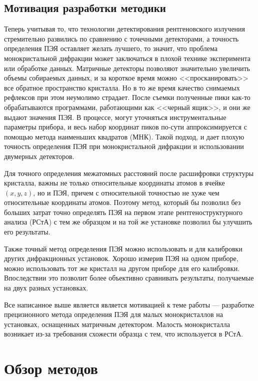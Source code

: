 \documentclass[a4paper,14pt]{extarticle}
\newcounter{x}
\begin{document}
\subsection{Мотивация разработки методики}

Теперь учитывая то, что технологии детектирования рентгеновского излучения стремительно развились по сравнению с точечными детекторами, а точность определения ПЭЯ оставляет желать лучшего, то значит, что проблема монокристальной дифракции может заключаться в плохой технике эксперимента или обработке данных.
Матричные детекторы позволяют значительно увеличить объемы собираемых данных, и за короткое время можно <<просканировать>> все обратное пространство кристалла.
Но в то же время качество снимаемых рефлексов при этом неумолимо страдает.
После съемки полученные пики как-то обрабатываются программами, работающими как <<черный ящик>>, и они же выдают значения ПЭЯ.
В процессе, могут уточняться инструментальные параметры прибора, и весь набор координат пиков по-сути аппроксимируется с помощью метода наименьших квадратов (МНК).
Такой подход, и дает плохую точность определения ПЭЯ при монокристальной дифракции и использовании двумерных детекторов.

Для точного определения межатомных расстояний после расшифровки структуры кристалла, важны не только относительные координаты атомов в ячейке $(x, y, z)$, но и ПЭЯ, причем с относительной точностью не хуже чем относительные координаты атомов.
Поэтому метод, который бы позволил без больших затрат точно определять ПЭЯ на первом этапе рентгеноструктурного анализа (РСтА) с тем же образцом и на той же установке позволил бы улучшить его результаты.

Также точный метод определения ПЭЯ можно использовать и для калибровки других дифракционных установок.
Хорошо измерив ПЭЯ на одном приборе, можно использовать тот же кристалл на другом приборе для его калибровки.
Впоследствии это позволит более объективно сравнивать результаты, получаемые на двух разных установках.

Все написанное выше является является мотивацией к теме работы --- разработке прецизионного метода определения ПЭЯ для малых монокристаллов на установках, оснащенных матричным детектором.
Малость монокристалла возникает из-за требования схожести образца с тем, что используется в РСтА.

\section{Обзор методов}
\end{document}
